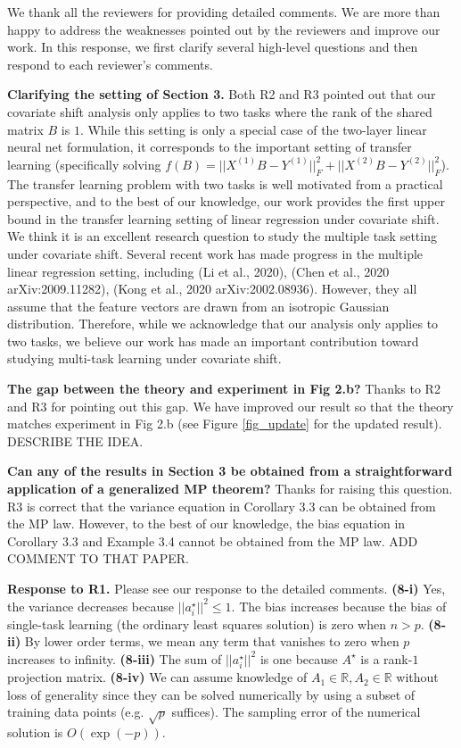 \documentclass{article}
\begin{document}
	We thank all the reviewers for providing detailed comments.
	We are more than happy to address the weaknesses pointed out by the reviewers and improve our work.
	In this response, we first clarify several high-level questions and then respond to each reviewer's comments.

	\textbf{Clarifying the setting of Section 3.} Both R2 and R3 pointed out that our covariate shift analysis only applies to two tasks where the rank of the shared matrix $B$ is $1$.
	While this setting is only a special case of the two-layer linear neural net formulation, it corresponds to the important setting of transfer learning (specifically solving $f(B) = ||X^{(1)} B - Y^{(1)}||_F^2 + ||X^{(2)} B - Y^{(2)}||_F^2$).
	The transfer learning problem with two tasks is well motivated from a practical perspective, and to the best of our knowledge, our work provides the first upper bound in the transfer learning setting of linear regression under covariate shift.
	We think it is an excellent research question to study the multiple task setting under covariate shift.
	Several recent work has made progress in the multiple linear regression setting, including (Li et al., 2020), (Chen et al., 2020 arXiv:2009.11282), (Kong et al., 2020 arXiv:2002.08936).
	However, they all assume that the feature vectors are drawn from an isotropic Gaussian distribution.
	Therefore, while we acknowledge that our analysis only applies to two tasks, we believe our work has made an important contribution toward studying multi-task learning under covariate shift.

	\textbf{The gap between the theory and experiment in Fig 2.b?} Thanks to R2 and R3 for pointing out this gap.
	We have improved our result so that the theory matches experiment in Fig 2.b (see Figure \ref{fig_update} for the updated result).
	DESCRIBE THE IDEA.

	\textbf{Can any of the results in Section 3 be obtained from a straightforward application of a generalized MP theorem?}
	Thanks for raising this question. R3 is correct that the variance equation in Corollary 3.3 can be obtained from the MP law.
	However, to the best of our knowledge, the bias equation in Corollary 3.3 and Example 3.4 cannot be obtained from the MP law.
	ADD COMMENT TO THAT PAPER.

	\textbf{Response to R1.} Please see our response to the detailed comments.
	\textbf{(8-i)} Yes, the variance decreases because $||{a_i^{\star}}||^2 \le 1$.
	The bias increases because the bias of single-task learning (the ordinary least squares solution) is zero when $n > p$.
	\textbf{(8-ii)} By lower order terms, we mean any term that vanishes to zero when $p$ increases to infinity.
	\textbf{(8-iii)} The sum of $||{a_i^{\star}}||^2$ is one because $A^{\star}$ is a rank-$1$ projection matrix.
	\textbf{(8-iv)} %
	We can assume knowledge of $A_1 \in \mathbb R, A_2 \in \mathbb R$ without loss of generality since they can be solved numerically by using a subset of training data points (e.g. $\sqrt{p}$ suffices).
	The sampling error of the numerical solution is $O(\exp(-p))$.
\end{document}
